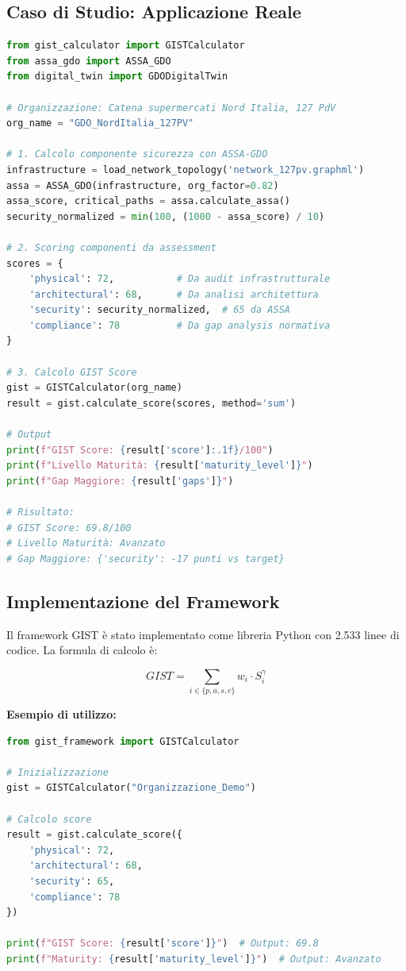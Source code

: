 \subsection{\texorpdfstring{Caso di Studio: Applicazione Reale}{5.3.3 - Caso di Studio: Applicazione Reale}}

\begin{lstlisting}[language=Python, caption=Calcolo GIST per catena GDO reale]
from gist_calculator import GISTCalculator
from assa_gdo import ASSA_GDO
from digital_twin import GDODigitalTwin

# Organizzazione: Catena supermercati Nord Italia, 127 PdV
org_name = "GDO_NordItalia_127PV"

# 1. Calcolo componente sicurezza con ASSA-GDO
infrastructure = load_network_topology('network_127pv.graphml')
assa = ASSA_GDO(infrastructure, org_factor=0.82)
assa_score, critical_paths = assa.calculate_assa()
security_normalized = min(100, (1000 - assa_score) / 10)

# 2. Scoring componenti da assessment
scores = {
    'physical': 72,           # Da audit infrastrutturale
    'architectural': 68,      # Da analisi architettura
    'security': security_normalized,  # 65 da ASSA
    'compliance': 78          # Da gap analysis normativa
}

# 3. Calcolo GIST Score
gist = GISTCalculator(org_name)
result = gist.calculate_score(scores, method='sum')

# Output
print(f"GIST Score: {result['score']:.1f}/100")
print(f"Livello Maturità: {result['maturity_level']}")
print(f"Gap Maggiore: {result['gaps']}")

# Risultato:
# GIST Score: 69.8/100
# Livello Maturità: Avanzato
# Gap Maggiore: {'security': -17 punti vs target}
\end{lstlisting}

\subsection{\texorpdfstring{Implementazione del Framework}{5.3.2 - Implementazione del Framework}}

Il framework GIST è stato implementato come libreria Python con 2.533 
linee di codice. La formula di calcolo è:

\begin{equation}
GIST = \sum_{i \in \{p,a,s,c\}} w_i \cdot S_i^{\gamma}
\end{equation}

\textbf{Esempio di utilizzo:}
\begin{lstlisting}[language=Python]
from gist_framework import GISTCalculator

# Inizializzazione
gist = GISTCalculator("Organizzazione_Demo")

# Calcolo score
result = gist.calculate_score({
    'physical': 72,
    'architectural': 68,
    'security': 65,
    'compliance': 78
})

print(f"GIST Score: {result['score']}")  # Output: 69.8
print(f"Maturity: {result['maturity_level']}")  # Output: Avanzato
\end{lstlisting}

